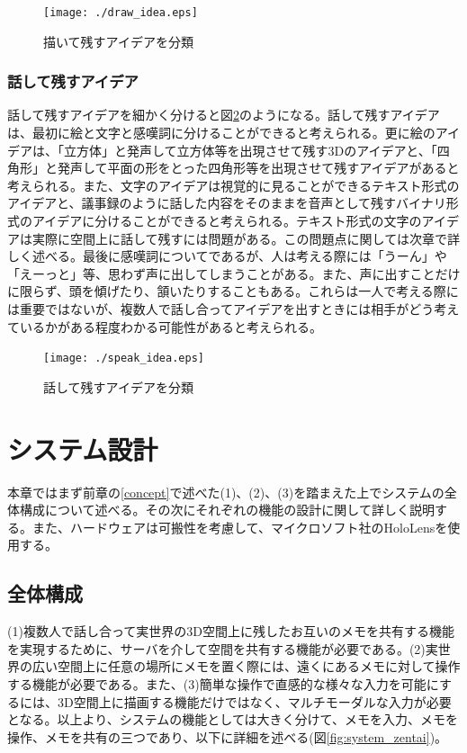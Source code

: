 \documentclass[11pt,a4j, titlepage]{jarticle} %
\begin{document}
\begin{figure}[H]
  \begin{center}
    \texttt{[image: ./draw\_idea.eps]}
    \caption{描いて残すアイデアを分類}
    \label{fig:draw_idea}
  \end{center}
\end{figure}

\subsubsection{話して残すアイデア} \label{speak_idea}
話して残すアイデアを細かく分けると図\ref{fig:speak_idea}のようになる。話して残すアイデアは、最初に絵と文字と感嘆詞に分けることができると考えられる。更に絵のアイデアは、「立方体」と発声して立方体等を出現させて残す3Dのアイデアと、「四角形」と発声して平面の形をとった四角形等を出現させて残すアイデアがあると考えられる。また、文字のアイデアは視覚的に見ることができるテキスト形式のアイデアと、議事録のように話した内容をそのままを音声として残すバイナリ形式のアイデアに分けることができると考えられる。テキスト形式の文字のアイデアは実際に空間上に話して残すには問題がある。この問題点に関しては次章で詳しく述べる。最後に感嘆詞についてであるが、人は考える際には「うーん」や「えーっと」等、思わず声に出してしまうことがある。また、声に出すことだけに限らず、頭を傾げたり、頷いたりすることもある。これらは一人で考える際には重要ではないが、複数人で話し合ってアイデアを出すときには相手がどう考えているかがある程度わかる可能性があると考えられる。

\begin{figure}[H]
  \begin{center}
    \texttt{[image: ./speak\_idea.eps]}
    \caption{話して残すアイデアを分類}
    \label{fig:speak_idea}
  \end{center}
\end{figure}

\newpage
\section{システム設計}
本章ではまず前章の\ref{concept}で述べた(1)、(2)、(3)を踏まえた上でシステムの全体構成について述べる。その次にそれぞれの機能の設計に関して詳しく説明する。また、ハードウェアは可搬性を考慮して、マイクロソフト社のHoloLens\cite{hololens}を使用する。

\subsection{全体構成}
(1)複数人で話し合って実世界の3D空間上に残したお互いのメモを共有する機能を実現するために、サーバを介して空間を共有する機能が必要である。(2)実世界の広い空間上に任意の場所にメモを置く際には、遠くにあるメモに対して操作する機能が必要である。また、(3)簡単な操作で直感的な様々な入力を可能にするには、3D空間上に描画する機能だけではなく、マルチモーダルな入力が必要となる。以上より、システムの機能としては大きく分けて、メモを入力、メモを操作、メモを共有の三つであり、以下に詳細を述べる(図\ref{fig:system_zentai})。
\end{document}
